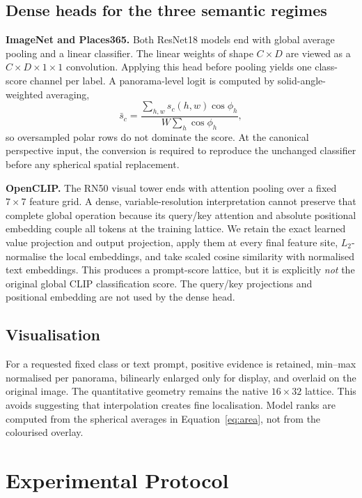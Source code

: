 \documentclass{isprs}
\begin{document}
\subsection{Dense heads for the three semantic regimes}

\textbf{ImageNet and Places365.}  Both ResNet18 models end with global average
pooling and a linear classifier.  The linear weights of shape $C\times D$ are
viewed as a $C\times D\times1\times1$ convolution.  Applying this head before
pooling yields one class-score channel per label.  A panorama-level logit is
computed by solid-angle-weighted averaging,
\begin{equation}
 \bar{s}_c=\frac{\sum_{h,w}s_c(h,w)\cos\phi_h}
                  {W\sum_h\cos\phi_h},
 \label{eq:area}
\end{equation}
so oversampled polar rows do not dominate the score.  At the canonical
perspective input, the conversion is required to reproduce the unchanged
classifier before any spherical spatial replacement.

\textbf{OpenCLIP.}  The RN50 visual tower ends with attention pooling over a
fixed $7\!\times\!7$ feature grid.  A dense, variable-resolution interpretation
cannot preserve that complete global operation because its query/key attention
and absolute positional embedding couple all tokens at the training lattice.
We retain the exact learned value projection and output projection, apply them
at every final feature site, $L_2$-normalise the local embeddings, and take
scaled cosine similarity with normalised text embeddings.  This produces a
prompt-score lattice, but it is explicitly \emph{not} the original global CLIP
classification score.  The query/key projections and positional embedding are
not used by the dense head.

\subsection{Visualisation}

For a requested fixed class or text prompt, positive evidence is retained,
min--max normalised per panorama, bilinearly enlarged only for display, and
overlaid on the original image.  The quantitative geometry remains the native
$16\!\times\!32$ lattice.  This avoids suggesting that interpolation creates
fine localisation.  Model ranks are computed from the spherical averages in
Equation~\ref{eq:area}, not from the colourised overlay.

\section{Experimental Protocol}
\end{document}

